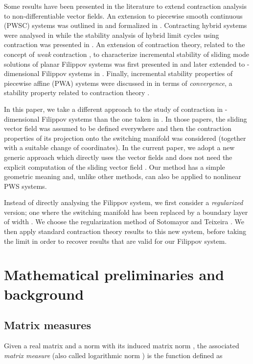 \documentclass[twocolumn]{autart}
\begin{document}
Some results have been presented in the literature to extend contraction analysis to non-differentiable vector fields. An extension to piecewise smooth continuous (PWSC) systems was outlined in \citep{lohmiller2000nonlinear} and formalized in \citep{di2014contraction}. Contracting hybrid systems were analysed in \citep{lohmiller2000nonlinear} while the stability analysis of hybrid limit cycles using contraction was presented in \citep{tang2014transverse}. An extension of contraction theory, related to the concept of \emph{weak} contraction \citep{sontag2014three}, to characterize incremental stability of sliding mode solutions of planar Filippov systems was first presented in \citep{di2013incremental} and later extended to -dimensional Filippov systems in \citep{di2014incremental}. Finally, incremental stability properties of piecewise affine (PWA) systems were discussed in \citep{pavlov2007convergence} in terms of \emph{convergence}, a stability property related to contraction theory \citep{pavlov2004convergent}.

In this paper, we take a different approach to the study of contraction in -dimensional Filippov systems than the one taken in \citep{di2013incremental,di2014incremental}. In those papers, the sliding vector field  was assumed to be defined everywhere and then the contraction properties of its projection onto the switching manifold was considered (together with a suitable change of coordinates). In the current paper, we adopt a new generic approach which directly uses the vector fields  and does not need the explicit computation of the sliding vector field . Our method has a simple geometric meaning and, unlike other methods, can also be applied to nonlinear PWS systems. 


Instead of directly analysing the Filippov system, we first consider a {\it regularized} version; one where the switching manifold  has been replaced by a boundary layer of width . We choose the regularization method of Sotomayor and Teixeira \citep{sotomayor1996regularization}. We then apply standard contraction theory results to this new system, before taking the limit  in order to recover results that are valid for our Filippov system.
\section{Mathematical preliminaries and background}
\label{sec:background}
\subsection{Matrix measures}
\label{app:matrix_measure}
Given a real matrix  and a norm  with its induced matrix norm , the associated \emph{matrix measure} (also called logarithmic norm \citep{dahlquist1958stability,lozinskii1958error,strom1975logarithmic}) is the function  defined as 
\end{document}
